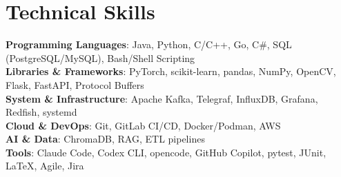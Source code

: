 \section{Technical Skills}
\begin{itemize}[leftmargin=0.15in, label={}]
	\small{\item{
		      \textbf{Programming Languages}{: Java, Python, C/C++, Go, C\#, SQL (PostgreSQL/MySQL), Bash/Shell Scripting}
		      \\
		      \textbf{Libraries \& Frameworks}{: PyTorch, scikit-learn, pandas, NumPy, OpenCV, Flask, FastAPI, Protocol Buffers}
		      \\
		      \textbf{System \& Infrastructure}{: Apache Kafka, Telegraf, InfluxDB, Grafana, Redfish, systemd}
		      \\
		      \textbf{Cloud \& DevOps}{: Git, GitLab CI/CD, Docker/Podman, AWS}
		      \\
		      \textbf{AI \& Data}{: ChromaDB, RAG, ETL pipelines}
		      \\
		      \textbf{Tools}{: Claude Code, Codex CLI, opencode, GitHub Copilot, pytest, JUnit, LaTeX, Agile, Jira}
	      }}
\end{itemize}\vspace{\gapAfterSkills} %
